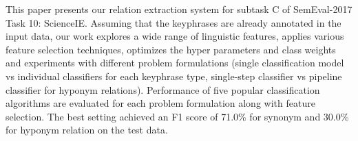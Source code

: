 This paper presents our relation extraction system for subtask C of SemEval-2017 Task 10: ScienceIE. Assuming that the keyphrases are already annotated in the input data, our work explores a  wide range of linguistic features, applies various feature selection techniques, optimizes the hyper parameters and class weights and experiments with different problem formulations (single classification model vs individual classifiers for each keyphrase type, single-step classifier vs pipeline classifier for hyponym relations). Performance of five popular classification algorithms are evaluated for each problem formulation along with feature selection. The best setting achieved an F1 score of 71.0\% for synonym and 30.0\% for hyponym relation on the test data.

